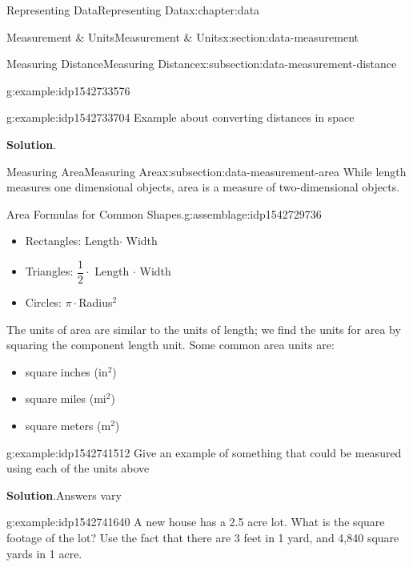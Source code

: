 \documentclass[oneside,10pt,]{book}
\newcommand{\blocktitlefont}{\relax}
\begin{document}
\begin{chapterptx}{Representing Data}{}{Representing Data}{}{}{x:chapter:data}
\begin{sectionptx}{Measurement \& Units}{}{Measurement \& Units}{}{}{x:section:data-measurement}
\begin{subsectionptx}{Measuring Distance}{}{Measuring Distance}{}{}{x:subsection:data-measurement-distance}
\begin{example}{}{g:example:idp1542733576}
\end{example}
\begin{example}{}{g:example:idp1542733704}%
Example about converting distances in space%
\par\smallskip%
\noindent\textbf{\blocktitlefont Solution}.\hypertarget{g:solution:idp1542728968}{}\quad{}%
\end{example}
\end{subsectionptx}
%
%
\typeout{************************************************}
\typeout{************************************************}
%
\begin{subsectionptx}{Measuring Area}{}{Measuring Area}{}{}{x:subsection:data-measurement-area}
While length measures one dimensional objects, area is a measure of two-dimensional objects.%
\begin{assemblage}{Area Formulas for Common Shapes.}{g:assemblage:idp1542729736}%
%
\begin{itemize}[label=\textbullet]
\item{}Rectangles: Length\(\cdot\) Width%
\item{}Triangles: \(\dfrac{1}{2}\cdot\) Length \(\cdot\) Width%
\item{}Circles: \(\pi\cdot\)Radius\(^2\)%
\end{itemize}
%
\end{assemblage}
The units of area are similar to the units of length; we find the units for area by squaring the component length unit.  Some common area units are:%
\par
%
\begin{itemize}[label=\textbullet]
\item{}square inches (in\(^2\))%
\item{}square miles (mi\(^2\))%
\item{}square meters (m\(^2\))%
\end{itemize}
%
\begin{example}{}{g:example:idp1542741512}%
Give an example of something that could be measured using each of the units above%
\par\smallskip%
\noindent\textbf{\blocktitlefont Solution}.\hypertarget{g:solution:idp1542738440}{}\quad{}Answers vary%
\end{example}
\begin{example}{}{g:example:idp1542741640}%
A new house has a 2.5 acre lot.  What is the square footage of the lot?  Use the fact that there are 3 feet in 1 yard, and 4,840 square yards in 1 acre.%
\par\smallskip%

\end{example}
\end{subsectionptx}
\end{sectionptx}
\end{chapterptx}
\end{document}

